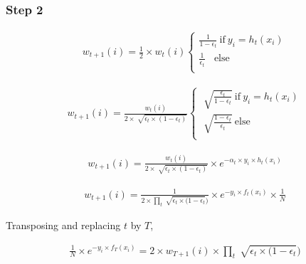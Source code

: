 \documentclass[11pt, a4paper]{article}
\begin{document}
\subsubsection{Step 2}

\begin{align*}
	w_{t+1}(i) = \frac{1}{2} \times w_t(i) \left\{      
	\begin{array}{ll}                                   
	\frac{1}{1-\epsilon_{t}}\ \text{if}\ y_i = h_t(x_i) \\
	\frac{1}{\epsilon_{t}}\ \ \ \ \text{else}           \\
	\end{array}                                         
	\right.                                             
\end{align*}

\begin{align*}
	w_{t+1}(i) = \frac{w_t(i)}{2\times \sqrt[]{\epsilon_t \times (1- \epsilon_t)}} \left\{ 
	\begin{array}{ll}                                                                      
	\sqrt[]{\frac{\epsilon_t}{1-\epsilon_t}}\ \text{if}\ y_i = h_t(x_i)                    \\
	\sqrt[]{\frac{1-\epsilon_t}{\epsilon_t}}\ \text{else}                                  \\
	\end{array}                                                                            
	\right.                                                                                
\end{align*}

\begin{align*}
	w_{t+1}(i) = \frac{w_t(i)}{2\times \sqrt[]{\epsilon_t \times (1- \epsilon_t)}} \times e^{-\alpha_t \times y_i \times h_t(x_i)} 
\end{align*}

\begin{align*}
	w_{t+1}(i) = \frac{1}{2\times \prod\limits_t{\sqrt[]{\epsilon_t \times (1- \epsilon_t}})} \times e^{-y_i \times f_t(x_i)} \times \frac{1}{N} 
\end{align*}

Transposing and replacing $t$ by $T$,

\begin{align*}
	\frac{1}{N} \times e^{-y_i \times f_T(x_i)}  = 2 \times w_{T+1}(i) \times \prod\limits_t{\sqrt[]{\epsilon_t \times (1- \epsilon_t}}) 
\end{align*}
\end{document}
